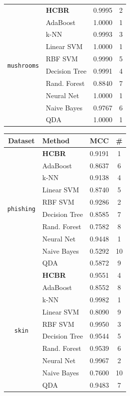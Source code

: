 \documentclass[preprint,12pt]{elsarticle}
\def\bfHCBR{{\sc \bf HCBR}}
\theoremstyle{definition}
\begin{document}
\begin{table}[h!]
\begin{minipage}{.5\linewidth}
\begin{tabular}{|c|l|l|c|}
\multirow{10}{*}{\texttt{mushrooms}} & \bfHCBR & 0.9995 & 2 \\
& AdaBoost & 1.0000 & 1\\
& k-NN & 0.9993 & 3\\
& Linear SVM & 1.0000 & 1\\
& RBF SVM & 0.9990 & 5\\
& Decision Tree &  0.9991& 4\\
& Rand. Forest & 0.8840  & 7\\
& Neural Net &1.0000 & 1\\
& Naive Bayes & 0.9767 & 6\\
& QDA & 1.0000 & 1\\ \hline

\end{tabular}
\end{minipage}%
    \begin{minipage}{.5\linewidth}
\fontsize{10pt}{12pt}\selectfont 
\begin{tabular}{|c|l|l|c|}
\hline
 Dataset & Method & MCC & \#  \\ \hline

\multirow{10}{*}{\texttt{phishing}} & \bfHCBR & 0.9191 &  1\\
& AdaBoost & 0.8637 & 6\\
& k-NN & 0.9138 & 4\\
& Linear SVM & 0.8740 & 5\\
& RBF SVM & 0.9286 & 2\\
& Decision Tree & 0.8585 & 7\\
& Rand. Forest & 0.7582 & 8\\
& Neural Net & 0.9448 & 1\\
& Naive Bayes & 0.5292 & 10\\
& QDA & 0.5872 & 9\\ \hline

\multirow{10}{*}{\texttt{skin}} & \bfHCBR & 0.9551 & 4 \\
& AdaBoost & 0.8552 & 8\\
& k-NN & 0.9982 & 1 \\
& Linear SVM & 0.8090 & 9\\
& RBF SVM & 0.9950 & 3 \\
& Decision Tree & 0.9544 & 5\\
& Rand. Forest & 0.9539 & 6\\
& Neural Net & 0.9967 & 2\\
& Naive Bayes & 0.7600 & 10\\
& QDA & 0.9483 & 7\\ \hline


\end{tabular}
\end{minipage}
\end{table}
\end{document}
